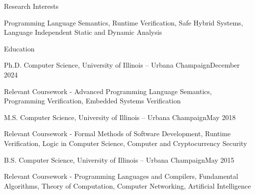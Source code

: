 \documentclass{resume} %
\begin{document}
 
\begin{rSection}{Research Interests}
\item Programming Language Semantics, Runtime Verification, Safe Hybrid Systems, Language Independent Static and Dynamic Analysis
\end{rSection}

\begin{rSection}{Education}
\begin{rSubsection}{Ph.D. Computer Science, University of Illinois -- Urbana Champaign}{December 2024}{}{}
\item Relevant Coursework - Advanced Programming Language Semantics, Programming Verification, Embedded Systems Verification
\end{rSubsection}
\begin{rSubsection}{M.S. Computer Science, University of Illinois -- Urbana Champaign}{May 2018}{}{}
\item Relevant Coursework - Formal Methods of Software Development, Runtime Verification, Logic in Computer Science, Computer and Cryptocurrency Security
\end{rSubsection}
\begin{rSubsection}{B.S. Computer Science, University of Illinois -- Urbana Champaign}{May 2015}{}{}
\item Relevant Coursework - Programming Languages and Compilers, Fundamental Algorithms, Theory of Computation, Computer Networking, Artificial Intelligence
\end{rSubsection}
\end{rSection}
\end{document}

